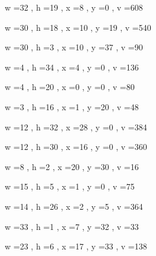 \documentclass[11pt]{article}
\begin{document}
w =32 , h =19 , x =8 , y =0 , v =608
\par
w =30 , h =18 , x =10 , y =19 , v =540
\par
w =30 , h =3 , x =10 , y =37 , v =90
\par
w =4 , h =34 , x =4 , y =0 , v =136
\par
w =4 , h =20 , x =0 , y =0 , v =80
\par
w =3 , h =16 , x =1 , y =20 , v =48
\par
\newpage




w =12 , h =32 , x =28 , y =0 , v =384
\par
w =12 , h =30 , x =16 , y =0 , v =360
\par
w =8 , h =2 , x =20 , y =30 , v =16
\par
w =15 , h =5 , x =1 , y =0 , v =75
\par
w =14 , h =26 , x =2 , y =5 , v =364
\par
w =33 , h =1 , x =7 , y =32 , v =33
\par
w =23 , h =6 , x =17 , y =33 , v =138
\par
\newpage
\end{document}

